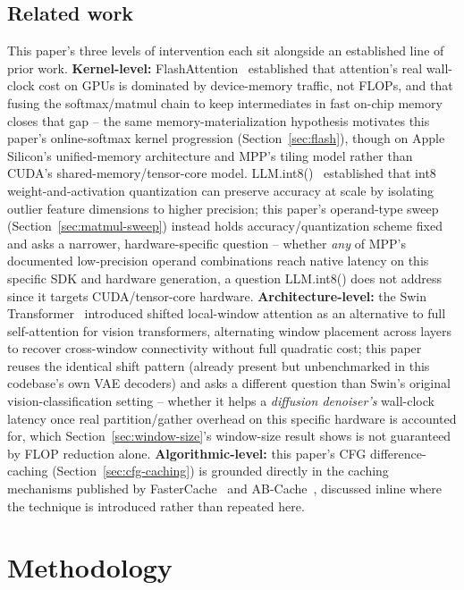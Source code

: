 \documentclass[11pt]{article}
\begin{document}
\subsection{Related work}
This paper's three levels of intervention each sit alongside an established line of prior work.
\textbf{Kernel-level:} FlashAttention~\cite{flashattention} established that attention's real
wall-clock cost on GPUs is dominated by device-memory traffic, not FLOPs, and that fusing the
softmax/matmul chain to keep intermediates in fast on-chip memory closes that gap -- the same
memory-materialization hypothesis motivates this paper's online-softmax kernel progression
(Section~\ref{sec:flash}), though on Apple Silicon's unified-memory architecture and MPP's tiling
model rather than CUDA's shared-memory/tensor-core model. LLM.int8()~\cite{llmint8} established
that int8 weight-and-activation quantization can preserve accuracy at scale by isolating outlier
feature dimensions to higher precision; this paper's operand-type sweep
(Section~\ref{sec:matmul-sweep}) instead holds accuracy/quantization scheme fixed and asks a
narrower, hardware-specific question -- whether \emph{any} of MPP's documented low-precision
operand combinations reach native latency on this specific SDK and hardware generation, a question
LLM.int8() does not address since it targets CUDA/tensor-core hardware.
\textbf{Architecture-level:} the Swin Transformer~\cite{swin} introduced shifted local-window
attention as an alternative to full self-attention for vision transformers, alternating window
placement across layers to recover cross-window connectivity without full quadratic cost; this
paper reuses the identical shift pattern (already present but unbenchmarked in this codebase's own
VAE decoders) and asks a different question than Swin's original vision-classification setting --
whether it helps a \emph{diffusion denoiser's} wall-clock latency once real partition/gather
overhead on this specific hardware is accounted for, which Section~\ref{sec:window-size}'s
window-size result shows is not guaranteed by FLOP reduction alone.
\textbf{Algorithmic-level:} this paper's CFG difference-caching (Section~\ref{sec:cfg-caching}) is
grounded directly in the caching mechanisms published by FasterCache~\cite{fastercache} and
AB-Cache~\cite{abcache}, discussed inline where the technique is introduced rather than repeated
here.

\section{Methodology}
\end{document}
